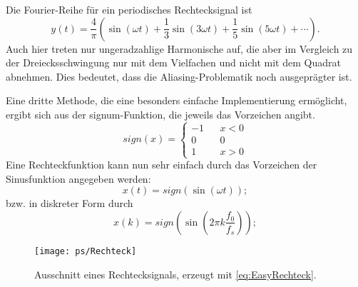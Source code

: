 \begin{itemize}
{Die Fourier-Reihe für ein periodisches Rechtecksignal ist
\begin{equation}\label{eq:RechteckFourier}
y(t) = \frac{4}{\pi}\left(\sin(\omega t) + \frac{1}{3} \sin(3\omega t) + \frac{1}{5} \sin(5 \omega t) + \cdots\right).
\end{equation}
Auch hier treten nur ungeradzahlige Harmonische auf, die aber im Vergleich zu der Dreiecksschwingung
nur mit dem Vielfachen und nicht mit dem Quadrat abnehmen. Dies bedeutet, dass die Aliasing-Problematik
noch ausgeprägter ist.

Eine dritte Methode, die eine besonders einfache Implementierung ermöglicht, ergibt sich aus
der signum-Funktion, die jeweils das Vorzeichen angibt.
\begin{equation}
sign(x) = \left\{ \begin{array}{lcc}
-1 & & x<0\\
0 & & 0\\
1 & & x>0
\end{array} \right.
\end{equation}
Eine Rechteckfunktion kann nun sehr einfach durch das Vorzeichen der Sinusfunktion angegeben werden:
\begin{equation}\label{eq:EasyRechteck}
x(t) = sign(\sin(\omega t));
\end{equation}
bzw. in diskreter Form durch
\begin{equation}\label{eq:EasyRechteckDiskret}
x(k) = sign(\sin\left(2\pi k \frac{f_0}{f_s}\right));
\end{equation}

\begin{figure}[h]
\begin{center}
\texttt{[image: ps/Rechteck]}
\caption{\label{pic:RechteckFunktion} Ausschnitt eines Rechtecksignals, erzeugt mit \ref{eq:EasyRechteck}.}
\end{center}
\end{figure}



}
\end{itemize}
